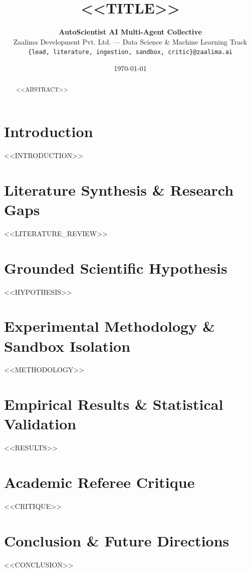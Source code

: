 \documentclass[10pt,twocolumn,letterpaper]{article}
\title{\textbf{<<TITLE>>}}
\author{
    \textbf{AutoScientist AI Multi-Agent Collective} \\
    Zaalima Development Pvt. Ltd. --- Data Science \& Machine Learning Track \\
    \texttt{\{lead, literature, ingestion, sandbox, critic\}@zaalima.ai}
}
\date{\today}
\begin{document}
\maketitle

\begin{abstract}
<<ABSTRACT>>
\end{abstract}

\section{Introduction}
<<INTRODUCTION>>

\section{Literature Synthesis \& Research Gaps}
<<LITERATURE_REVIEW>>

\section{Grounded Scientific Hypothesis}
<<HYPOTHESIS>>

\section{Experimental Methodology \& Sandbox Isolation}
<<METHODOLOGY>>

\section{Empirical Results \& Statistical Validation}
<<RESULTS>>

\section{Academic Referee Critique}
<<CRITIQUE>>

\section{Conclusion \& Future Directions}
<<CONCLUSION>>



\end{document}
